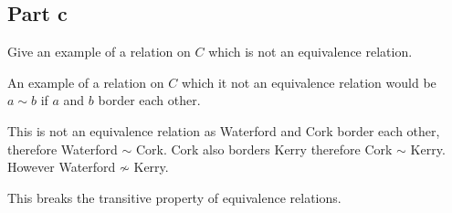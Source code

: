 \documentclass[12pt]{article} %
\begin{document}
\begin{homeworkProblem}
    \subsection*{Part c}

    \begin{grayBoxed}
        Give an example of a relation on $C$ which is not an equivalence relation.
    \end{grayBoxed}

    An example of a relation on $C$ which it not an equivalence relation would be $a \sim b$ if $a$ and $b$ border each other.

    This is not an equivalence relation as Waterford and Cork border each other, therefore Waterford $\sim$ Cork.
    Cork also borders Kerry therefore Cork $\sim$ Kerry. However Waterford $\not \sim$ Kerry.

    This breaks the transitive property of equivalence relations.

\end{homeworkProblem}
\end{document}
